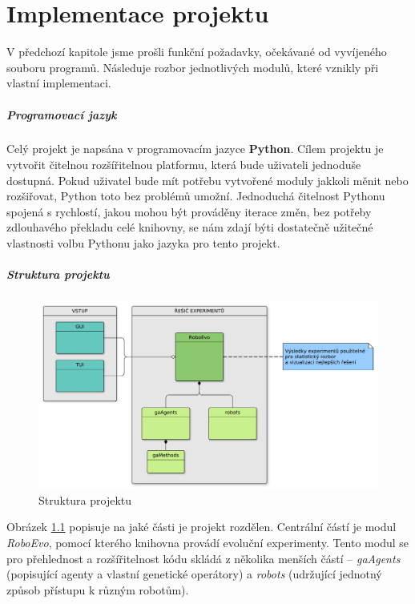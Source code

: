 
\chapter{Implementace projektu}
V předchozí kapitole jsme prošli funkční požadavky, očekávané od vyvíjeného
souboru programů. Následuje rozbor jednotlivých modulů, které vznikly při
vlastní implementaci. 

\paragraph{Programovací jazyk}
Celý projekt je napsána v programovacím jazyce \textbf{Python}. Cílem projektu
je vytvořit čitelnou rozšířitelnou platformu, která bude uživateli jednoduše
dostupná. Pokud uživatel bude mít potřebu vytvořené moduly jakkoli měnit nebo
rozšiřovat, Python toto bez problémů umožní. Jednoduchá čitelnost Pythonu
spojená s rychlostí, jakou mohou být prováděny iterace změn, bez potřeby
zdlouhavého překladu celé knihovny, se nám zdají býti dostatečně užitečné
vlastnosti volbu Pythonu jako jazyka pro tento projekt.

\paragraph{Struktura projektu}

\begin{figure}[!htb]
    \centering
    \includegraphics[width=1\textwidth]{../img/BP_imp_graph.pdf}
    \caption{Struktura projektu}
    \label{fig:struktura}
\end{figure}

Obrázek \ref{fig:struktura} popisuje na jaké části je projekt rozdělen.
Centrální částí je modul \emph{RoboEvo}, pomocí kterého knihovna provádí
evoluční experimenty. Tento modul se pro přehlednost a rozšířitelnost kódu
skládá z několika menších částí -- \emph{gaAgents} (popisující agenty a vlastní
genetické operátory) a \emph{robots} (udržující jednotný způsob přístupu k
různým robotům). 

